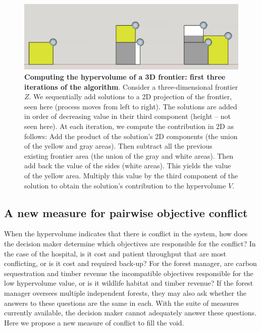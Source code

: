 \begin{figure}[ht]
\centering
\caption[First iterations for computing $\overbar{V}$]{\textbf{Computing the hypervolume of a 3D frontier: first three iterations of the algorithm}. Consider a three-dimensional frontier $Z$. We sequentially add solutions to a 2D projection of the frontier, seen here (process moves from left to right). The solutions are added in order of decreasing value in their third component (height -- not seen here). At each iteration, we compute the contribution in 2D as follows: Add the product of the solution's 2D components (the union of the yellow and gray areas). Then subtract all the previous existing frontier area (the union of the gray and white areas). Then add back the value of the sides (white areas). This yields the value of the yellow area. Multiply this value by the third component of the solution to obtain the solution's contribution to the hypervolume $V$.}
\label{fig:AlgoAid}
\includegraphics[width=.85\textwidth]{../images/3DFrontierSchematic_SketchUp_FirstSteps_2D_clean}
\end{figure}

\subsection{A new measure for pairwise objective conflict}
\label{sec:newConflictMetric}
When the hypervolume indicates that there is conflict in the system, how does the decision maker determine which objectives are responsible for the conflict? In the case of the hospital, is it cost and patient throughput that are most conflicting, or is it cost and required back-up? For the forest manager, are carbon sequestration and timber revenue the incompatible objectives responsible for the low hypervolume value, or is it wildlife habitat and timber revenue? If the forest manager oversees multiple independent forests, they may also ask whether the answers to these questions are the same in each. With the suite of measures currently available, the decision maker cannot adequately answer these questions. Here we propose a new measure of conflict to fill the void.

